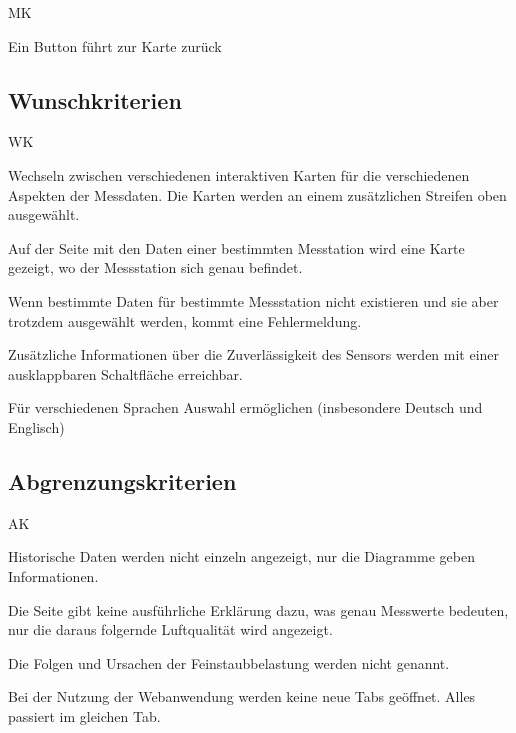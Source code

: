 \begin{Kriterien}{MK}	
	\item Ein Button führt zur Karte zurück
 
\end{Kriterien}

\newpage
\subsection{Wunschkriterien}
\setcounter{counter}{10}
\begin{Kriterien}{WK}

	\item Wechseln zwischen verschiedenen interaktiven Karten für die verschiedenen Aspekten der Messdaten. Die Karten werden an einem zusätzlichen Streifen oben ausgewählt.

	\item Auf der Seite mit den Daten einer bestimmten Messtation wird eine Karte gezeigt, wo der Messstation sich genau befindet. 

	\item Wenn bestimmte Daten für bestimmte Messstation nicht existieren und sie aber trotzdem ausgewählt werden, kommt eine Fehlermeldung.

	\item Zusätzliche Informationen über die Zuverlässigkeit des Sensors werden mit einer ausklappbaren Schaltfläche erreichbar.

	\item Für verschiedenen Sprachen Auswahl ermöglichen (insbesondere Deutsch und Englisch)

\end{Kriterien}

\subsection{Abgrenzungskriterien}
\setcounter{counter}{10}
\begin{Kriterien}{AK}

	\item Historische Daten werden nicht einzeln angezeigt, nur die Diagramme geben Informationen.
	
	\item Die Seite gibt keine ausführliche Erklärung dazu, was  genau Messwerte bedeuten, nur die daraus folgernde Luftqualität wird angezeigt. 
	
	\item Die Folgen und Ursachen der Feinstaubbelastung werden nicht genannt.
	
	\item Bei der Nutzung der Webanwendung werden keine neue Tabs geöffnet. Alles passiert im gleichen Tab.
	
\end{Kriterien}
